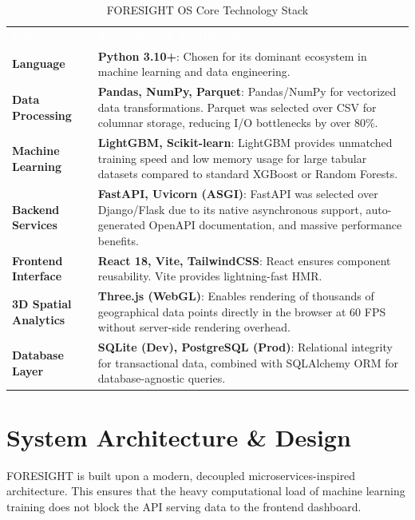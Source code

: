 \documentclass[12pt,a4paper]{report}
\begin{document}
\begin{table}[h]
\centering
\renewcommand{\arraystretch}{1.5}
\caption{FORESIGHT OS Core Technology Stack}
\label{tab:techstack}
\begin{tabularx}{\textwidth}{>{\hsize=0.6\hsize}X >{\hsize=1.4\hsize}X}
\rowcolor{zidiopurple}
\textcolor{white}{\textbf{Category}} & \textcolor{white}{\textbf{Technology \& Justification}} \\
\rowcolor{zidiogray!30}
\textbf{Language} & \textbf{Python 3.10+}: Chosen for its dominant ecosystem in machine learning and data engineering. \\
\textbf{Data Processing} & \textbf{Pandas, NumPy, Parquet}: Pandas/NumPy for vectorized data transformations. Parquet was selected over CSV for columnar storage, reducing I/O bottlenecks by over 80\%. \\
\rowcolor{zidiogray!30}
\textbf{Machine Learning} & \textbf{LightGBM, Scikit-learn}: LightGBM provides unmatched training speed and low memory usage for large tabular datasets compared to standard XGBoost or Random Forests. \\
\textbf{Backend Services} & \textbf{FastAPI, Uvicorn (ASGI)}: FastAPI was selected over Django/Flask due to its native asynchronous support, auto-generated OpenAPI documentation, and massive performance benefits. \\
\rowcolor{zidiogray!30}
\textbf{Frontend Interface} & \textbf{React 18, Vite, TailwindCSS}: React ensures component reusability. Vite provides lightning-fast HMR. \\
\textbf{3D Spatial Analytics} & \textbf{Three.js (WebGL)}: Enables rendering of thousands of geographical data points directly in the browser at 60 FPS without server-side rendering overhead. \\
\rowcolor{zidiogray!30}
\textbf{Database Layer} & \textbf{SQLite (Dev), PostgreSQL (Prod)}: Relational integrity for transactional data, combined with SQLAlchemy ORM for database-agnostic queries. \\
\end{tabularx}
\end{table}

\section{System Architecture \& Design}
FORESIGHT is built upon a modern, decoupled microservices-inspired architecture. This ensures that the heavy computational load of machine learning training does not block the API serving data to the frontend dashboard.
\end{document}
